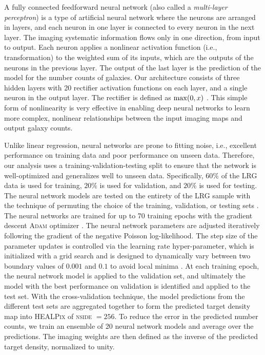 A fully connected feedforward neural network (also called a \textit{multi-layer perceptron}) is a type of artificial neural network where the neurons are arranged in layers, and each neuron in one layer is connected to every neuron in the next layer. The imaging systematic information flows only in one direction, from input to output. Each neuron applies a nonlinear activation function (i.e., transformation) to the weighted sum of its inputs, which are the outputs of the neurons in the previous layer. The output of the last layer is the prediction of the model for the number counts of galaxies. Our architecture consists of three hidden layers with 20 rectifier activation functions on each layer, and a single neuron in the output layer. The rectifier is defined as ${\rm max}(0, x)$ \citep{nair2010rectified}. This simple form of nonlinearity is very effective in enabling deep neural networks to learn more complex, nonlinear relationships between the input imaging maps and output galaxy counts.

Unlike linear regression, neural networks are prone to fitting noise, i.e., excellent performance on training data and poor performance on unseen data. Therefore, our analysis uses a training-validation-testing split to ensure that the network is well-optimized and generalizes well to unseen data. Specifically, $60\%$ of the LRG data is used for training, $20\%$ is used for validation, and $20\%$ is used for testing. The neural network models are tested on the entirety of the LRG sample with the technique of permuting the choice of the training, validation, or testing sets \citep{arlot2010survey}. The neural networks are trained for up to 70 training epochs with the gradient descent \textsc{Adam} optimizer \citep{2017arXiv171105101L}. The neural network parameters are adjusted iteratively following the gradient of the negative Poisson log-likelihood. The step size of the parameter updates is controlled via the learning rate hyper-parameter, which is initialized with a grid search and is designed to dynamically vary between two boundary values of $0.001$ and $0.1$ to avoid local minima \citep[see, also,][]{2016arXiv160803983L}. At each training epoch, the neural network model is applied to the validation set, and ultimately the model with the best performance on validation is identified and applied to the test set. With the cross-validation technique, the model predictions from the different test sets are aggregated together to form the predicted target density map into \textsc{HEALPix} of \textsc{nside} $=256$. To reduce the error in the predicted number counts, we train an ensemble of 20 neural network models and average over the predictions. The imaging weights are then defined as the inverse of the predicted target density, normalized to unity.

